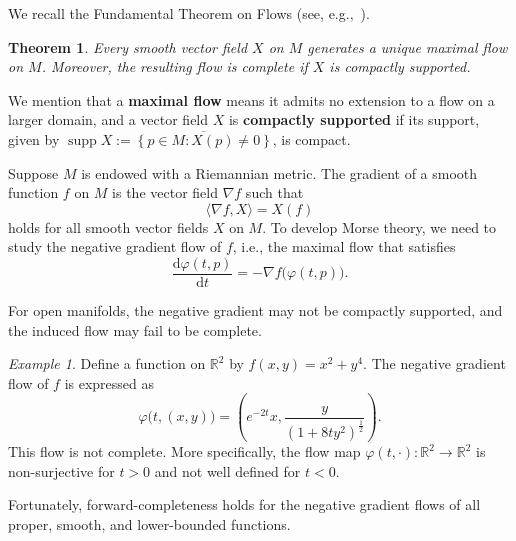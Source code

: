 \documentclass[11pt,letterpaper]{amsart}
\theoremstyle{plain}
\newtheorem{theorem}{Theorem}[section]
\theoremstyle{definition}
\theoremstyle{remark}
\newtheorem*{example}{Example}%
\numberwithin{equation}{section}
\begin{document}
We recall the Fundamental Theorem on Flows (see, e.g.,~\cite[Theorem 9.12]{Lee-2018}).

\begin{theorem}\label{T-2-1}
Every smooth vector field $X$ on $M$ generates a unique maximal flow on $M$. Moreover, the resulting flow is complete if $X$ is compactly supported.
\end{theorem}

We mention that a \textbf{maximal flow} means it admits no extension to a flow on a larger domain, and a vector field $X$ is \textbf{compactly supported} if its support,  given by
$\operatorname{supp} X:=\overline{\left\{p\in M: X(p)\neq 0\right\}}$, is compact.

Suppose $M$ is endowed with a Riemannian metric. The gradient of a smooth function $f$ on $M$ is the vector field $\nabla f$ such that
\[
\langle \nabla f, X\rangle= X(f)
\]
holds for all smooth vector fields $X$ on $M$. To develop Morse theory,  we need to study the negative gradient flow of $f$, i.e., the maximal flow that satisfies
\[
\frac{\mathrm{d}\varphi(t,p)}{\mathrm{d}t}
=-\nabla f\big(\varphi(t,p)\big).
\]

For open manifolds, the negative gradient may not be compactly supported, and the induced flow may fail to be complete.

\begin{example}
Define a function on $\mathbb R^2$ by $f(x,y)=x^2+y^4$. The negative gradient flow of $f$ is expressed as
\[
\varphi\big(t,(x,y)\big)=\left(e^{-2t}x,\frac{y}{(1+8ty^2)^{\frac{1}{2}}}\right).
\]
This flow is not complete. More specifically, the flow map $\varphi(t,\cdot):\mathbb R^2\to \mathbb R^2$ is non-surjective for $t>0$ and not well defined for $t<0$.
\end{example}


Fortunately, forward-completeness holds for the negative gradient flows of all proper, smooth, and lower-bounded functions.
\end{document}
